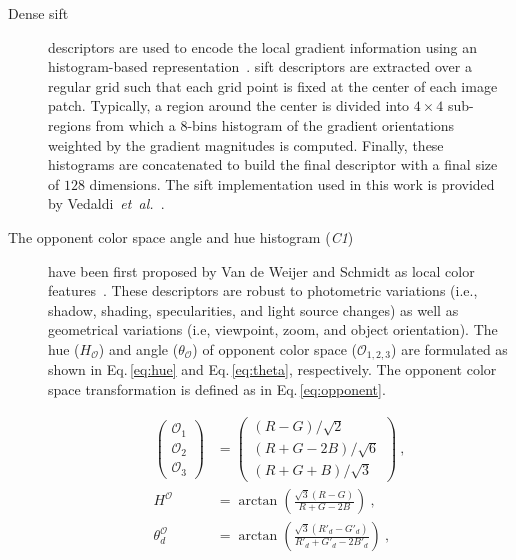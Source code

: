 
\begin{description}
\item[Dense \acf{sift}] descriptors are used to encode the local gradient information using an histogram-based representation~\cite{lowe1999object}. 
\ac{sift} descriptors are extracted over a regular grid such that each grid point is fixed at the center of each image patch.
Typically, a region around the center is divided into $4 \times 4$ sub-regions from which a $8$-bins histogram of the gradient orientations weighted by the gradient magnitudes is computed.
Finally, these histograms are concatenated to build the final descriptor with a final size of $128$ dimensions.
The \ac{sift} implementation used in this work is provided by Vedaldi~\emph{et~al.}~\cite{vedaldi2010vlfeat}.

\item[The opponent color space angle and hue histogram (\emph{C1})] have been first proposed by Van de Weijer and Schmidt as local color features~\cite{van2006coloring}.
These descriptors are robust to photometric variations (i.e., shadow, shading, specularities, and light source changes) as well as geometrical variations (i.e, viewpoint, zoom, and object orientation).
The hue ($H_{\mathcal{O}}$) and angle ($\theta_{\mathcal{O}}$) of opponent color space ($\mathcal{O}_{1,2,3}$) are formulated as shown in Eq.\,\ref{eq:hue} and Eq.\,\ref{eq:theta}, respectively.
The opponent color space transformation is defined as in Eq.\,\ref{eq:opponent}.

\begin{align}
    \begin{pmatrix}
      \mathcal{O}_{1}\\\mathcal{O}_{2} \\\mathcal{O}_{3}
    \end{pmatrix} & =
                    \begin{pmatrix}
                      (R-G)/\sqrt{2}\\
                      (R+G-2B)/\sqrt{6}\\
                      (R+G+B)/\sqrt{3}
                    \end{pmatrix}\ , \label{eq:opponent}\\
    H^{\mathcal{O}} & = \arctan\left(\frac{\sqrt{3}(R-G)}{R+G-2B}\right) \ ,\label{eq:hue}\\
    \theta_{d}^{\mathcal{O}} & = \arctan\left(\frac{\sqrt{3}(R'_{d}-G'_{d})}{R'_{d}+G'_{d}-2B'_{d}}\right)\ , \label{eq:theta}
  \end{align}


\end{description}
